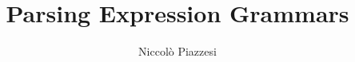 \documentclass{beamer}
\title{Parsing Expression Grammars}
\author{Niccolò Piazzesi}
\institute[UniPi]{
    Università degli Studi di Pisa \\
    Anno Accademico 2020-21
}
\begin{document}
    \begin{frame}
        \maketitle
    \end{frame}
\end{document}
